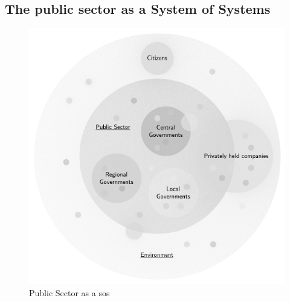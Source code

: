 \subsection{The public sector as a System of Systems}
\label{sub:tbpssystemofsystems}

\begin{figure}[H]
	\centering
	\includegraphics[width=0.5\linewidth]{images/pssystemofsystems}
	\caption[Public Sector as a \gls{sos}]{Public Sector as a \gls{sos}}
	\label{fig:pssystemofsystems}
\end{figure}

